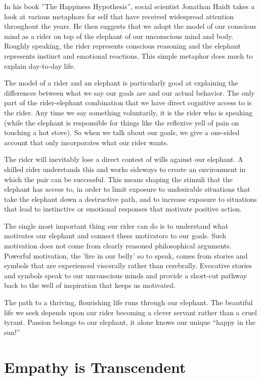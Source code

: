 \documentclass[ebook,12pt,openany,twoside]{memoir}
\begin{document}
In his book ''The Happiness Hypothesis'', social scientist Jonathan Haidt takes
a look at various metaphors for self that have received widespread attention
throughout the years. He then suggests that we adopt the model of our conscious
mind as a rider on top of the elephant of our unconscious mind and body.
Roughly speaking, the rider represents conscious reasoning and the elephant
represents instinct and emotional reactions. This simple metaphor does much to
explain day-to-day life.

The model of a rider and an elephant is particularly good at explaining the
differences between what we say our goals are and our actual behavior. The only
part of the rider-elephant combination that we have direct cognitive access to
is the rider. Any time we say something voluntarily, it is the rider who is
speaking (while the elephant is responsible for things like the reflexive yell
of pain on touching a hot stove). So when we talk about our goals, we give a
one-sided account that only incorporates what our rider wants.

The rider will inevitably lose a direct contest of wills against our elephant.
A skilled rider understands this and works sideways to create an environment in
which the pair can be successful. This means shaping the stimuli that the
elephant has access to, in order to limit exposure to undesirable situations
that take the elephant down a destructive path, and to increase exposure to
situations that lead to instinctive or emotional responses that motivate
positive action.

The single most important thing our rider can do is to understand what motivates our elephant and connect these motivators to our goals.  Such motivation does not come from clearly reasoned philosophical arguments.  Powerful motivation, the 'fire in our belly' so to speak, comes from stories and symbols that are experienced viscerally rather than cerebrally.  Evocative stories and symbols speak to our
unconscious minds and provide a short-cut pathway back to the well of
inspiration that keeps us motivated.

The path to a thriving, flourishing life runs through our elephant. The
beautiful life we seek depends upon our rider becoming a clever servant rather
than a cruel tyrant. 
Passion belongs to our elephant, it alone knows our unique
``happy in the sun!''







\chapter{Empathy is Transcendent}
\end{document}

